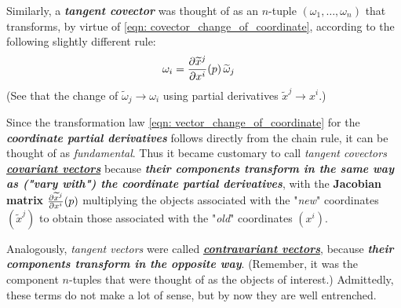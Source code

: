 \documentclass[11pt]{article}
\begin{document}
\begin{itemize}
\begin{remark}
Similarly, a \emph{\textbf{tangent covector}} was thought of as an $n$-tuple $(\omega_1,\ldots,\omega_n)$ that transforms, by virtue of \eqref{eqn: covector_change_of_coordinate}, according to the following slightly different rule:
\begin{align}
\omega_{i} &= \frac{\partial \widetilde{x}^{j}}{ \partial x^{i}}(p)\,\widetilde{\omega}_{j} \label{eqn: covector_component_change_of_coordinate}
\end{align} (See that the change of $\widetilde{\omega}_{j} \rightarrow \omega_{i} $ using partial derivatives $\widetilde{x}^{j} \rightarrow x^{i}$.)

Since the transformation law \eqref{eqn: vector_change_of_coordinate} for the \emph{\textbf{coordinate partial derivatives}} follows directly from the chain rule, it can be thought of as \emph{fundamental}. Thus it became customary to call \emph{tangent covectors} \underline{\textbf{\emph{covariant vectors}}} because \emph{\textbf{their components transform in the same way as ("vary with") the coordinate partial derivatives}}, with the \textbf{Jacobian matrix} $\frac{\partial \widetilde{x}^{j}}{ \partial x^{i}}(p)$ multiplying the objects associated with the "\emph{new}" coordinates $(\widetilde{x}^j)$ to obtain those associated with the "\emph{old}" coordinates $(x^i)$. 

Analogously, \emph{tangent vectors} were called \underline{\emph{\textbf{contravariant vectors}}}, because \emph{\textbf{their components transform in the opposite way}}. (Remember, it was the component $n$-tuples that were thought of as the objects of interest.) Admittedly, these terms do not make a lot of sense, but by now they are well entrenched.
\end{remark}
\end{itemize}
\end{document}
